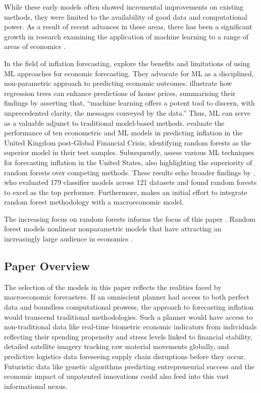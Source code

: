 While these early models often showed incremental improvements on existing methods, they were limited to the availability of good data and computational power. As a result of recent advances in these areas, there has been a significant growth in research examining the application of machine learning to a range of areas of economics \autocite{Athey2019TheEconomics}.

In the field of inflation forecasting, \textcite{Kleinberg2015PredictionProblems} explore the benefits and limitations of using ML approaches for economic forecasting. They advocate for ML as a disciplined, non-parametric approach to predicting economic outcomes. \textcite{Mullainathan2017MachineApproach} illustrate how regression trees can enhance predictions of house prices, summarising their findings by asserting that, ``machine learning offers a potent tool to discern, with unprecedented clarity, the messages conveyed by the data.” Thus, ML can serve as a valuable adjunct to traditional model-based methods. \textcite{Chakraborty2017MachineBanks} evaluate the performance of ten econometric and ML models in predicting inflation in the United Kingdom post-Global Financial Crisis, identifying random forests as the superior model in their test samples. Subsequently, \textcite{Medeiros2021ForecastingMethods} assess various ML techniques for forecasting inflation in the United States, also highlighting the superiority of random forests over competing methods. These results echo broader findings by \textcite{Fernandez-Delgado2014DoProblems}, who evaluated 179 classifier models across 121 datasets and found random forests to excel as the top performer. Furthermore, \textcite{GouletCoulombe2024TheForest} makes an initial effort to integrate random forest methodology with a macroeconomic model. 

The increasing focus on random forests informs the focus of this paper \autocite{Kohlscheen2021WhatInflation}. Random forest models nonlinear nonparametric models that have attracting an increasingly large audience in economics \autocite{Athey2019TheEconomics}.

\subsection{Paper Overview}

The selection of the models in this paper reflects the realities faced by macroeconomic forecasters. If an omniscient planner had access to both perfect data and boundless computational prowess, the approach to forecasting inflation would transcend traditional methodologies. Such a planner would have access to non-traditional data like real-time biometric economic indicators from individuals reflecting their spending propensity and stress levels linked to financial stability, detailed satellite imagery tracking raw material movements globally, and predictive logistics data foreseeing supply chain disruptions before they occur. Futuristic data like genetic algorithms predicting entrepreneurial success and the economic impact of unpatented innovations could also feed into this vast informational nexus.

